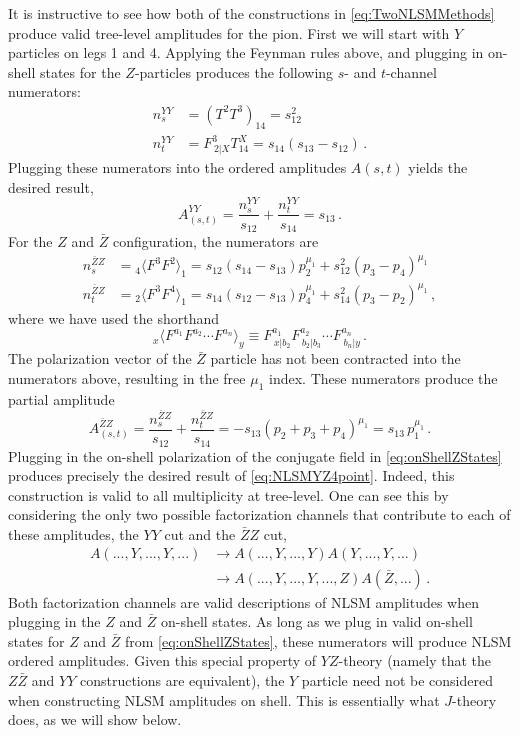 \documentclass[11pt,letter]{article}
\def\be{\begin{equation}}
\begin{document}
It is instructive to see how both of the constructions in \cref{eq:TwoNLSMMethods} produce valid tree-level amplitudes for the pion. First we will start with $Y$ particles on legs 1 and 4. Applying the Feynman rules above, and plugging in on-shell states for the $Z$-particles produces the following $s$- and $t$-channel numerators:
\begin{align}
n^{YY}_s &= (T^2T^3)_{14} = s_{12}^2 
\\
 n^{YY}_t &=  F^{3}_{\,2|X}T^X_{14}  = s_{14}(s_{13}-s_{12})\, .
\end{align}
Plugging these numerators into the ordered amplitudes $A(s,t)$ yields the desired result,
\be\label{eq:NLSMYZ4point}
A^{YY}_{(s,t)} = \frac{n^{YY}_s}{s_{12}}+\frac{ n^{YY}_t }{s_{14}} = s_{13}\, .
\end{equation}
For the $Z$ and $\bar{Z}$ configuration, the numerators are 
\begin{align}
n^{\bar{Z}Z}_s &= {}_4\langle F^{3}F^{2}\rangle_{1} =  s_{12}(s_{14}-s_{13})p_2^{\mu_1}+s_{12}^2(p_3-p_4)^{\mu_1}
\\
 n^{\bar{Z}Z}_t &=   {}_2\langle F^{3}F^{4}\rangle_{1}  = s_{14}(s_{12}-s_{13})p_4^{\mu_1}+s_{14}^2(p_3-p_2)^{\mu_1}\, ,
\end{align}
where we have used the shorthand
\begin{equation}
{}_x \langle F^{a_1}F^{a_2}\cdots F^{a_n}\rangle _{y} \equiv F^{a_1}_{\,x|b_2}F^{a_2}_{\,b_2|b_3}\cdots F^{a_n}_{\,b_n|y}\, .
\end{equation}
The polarization vector of the $\bar{Z}$ particle has not been contracted into the numerators above, resulting in the free $\mu_1$ index.
These numerators produce the partial amplitude
\begin{equation}
A^{\bar{Z}Z}_{(s,t)} = \frac{n^{\bar{Z}Z}_s}{s_{12}}+\frac{ n^{\bar{Z}Z}_t }{s_{14}} = -s_{13}(p_2+p_3+p_4)^{\mu_1} = s_{13} \,p_1^{\mu_1}\, .
\end{equation}
Plugging in the on-shell polarization of the conjugate field in \cref{eq:onShellZStates} produces precisely the desired result of \cref{eq:NLSMYZ4point}. Indeed, this construction is valid to all multiplicity at tree-level. One can see this by considering the only two possible factorization channels that contribute to each of these amplitudes, the $YY$ cut and the $\bar{Z}Z$ cut,
\begin{align} \label{YZCut1}
A(...,Y,...,Y,...) &\rightarrow A(...,Y,...,Y)A(Y,...,Y,...)
\\
&\rightarrow A(...,Y,...,Y,...,Z)A(\bar{Z},...) \, . \label{YZCut2}
\end{align}
Both factorization channels are valid descriptions of NLSM amplitudes when plugging in the $Z$ and $\bar{Z}$ on-shell states. As long as we plug in valid on-shell states for $Z$ and $\bar{Z}$ from \cref{eq:onShellZStates}, these numerators will produce NLSM ordered amplitudes. Given this special property of $YZ$-theory (namely that the $Z\bar{Z}$ and $YY$ constructions are equivalent), the $Y$ particle need not be considered when constructing NLSM amplitudes on shell. This is essentially what $J$-theory does, as we will show below.
\end{document}
